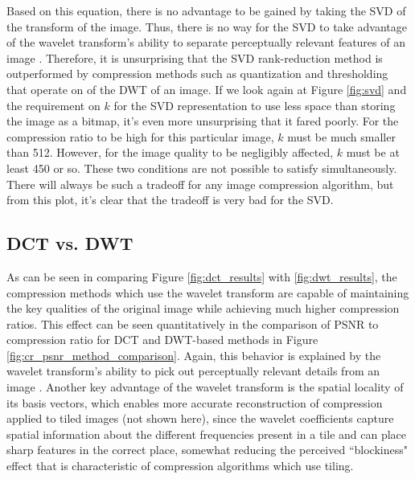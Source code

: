 \documentclass[conference]{IEEEtran}
\begin{document}
Based on this equation, there is no advantage to be gained by taking the SVD of the transform of the image.
Thus, there is no way for the SVD to take advantage of the wavelet transform's ability to separate perceptually relevant features of an image \cite{hvsWavelet}.
Therefore, it is unsurprising that the SVD rank-reduction method is outperformed by compression methods such as quantization and thresholding that operate on of the DWT of an image.
If we look again at Figure \ref{fig:svd} and the requirement on $k$ for the SVD representation to use less space than storing the image as a bitmap, it's even more unsurprising that it fared poorly.
For the compression ratio to be high for this particular image, $k$ must be much smaller than 512.
However, for the image quality to be negligibly affected, $k$ must be at least 450 or so.
These two conditions are not possible to satisfy simultaneously.
There will always be such a tradeoff for any image compression algorithm, but from this plot, it's clear that the tradeoff is very bad for the SVD.

\subsection{DCT vs. DWT}
As can be seen in comparing Figure \ref{fig:dct_results} with \ref{fig:dwt_results}, the compression methods which use the wavelet transform are capable of maintaining the key qualities of the original image while achieving much higher compression ratios.
This effect can be seen quantitatively in the comparison of PSNR to compression ratio for DCT and DWT-based methods in Figure \ref{fig:cr_psnr_method_comparison}.
Again, this behavior is explained by the wavelet transform's ability to pick out perceptually relevant details from an image \cite{hvsWavelet}.
Another key advantage of the wavelet transform is the spatial locality of its basis vectors,
which enables more accurate reconstruction of compression applied to tiled images (not shown here),
since the wavelet coefficients capture spatial information about the different frequencies present in a tile and can place sharp features in the correct place,
somewhat reducing the perceived ``blockiness" effect that is characteristic of compression algorithms which use tiling.
\end{document}
